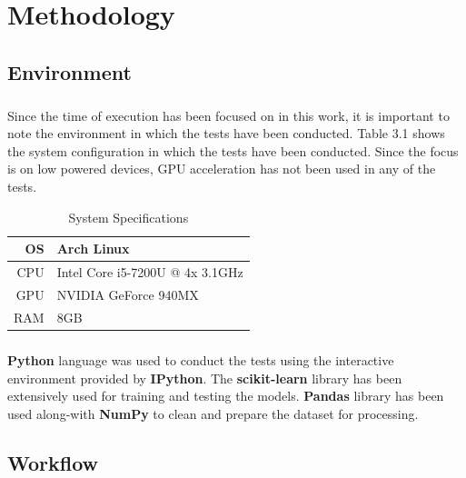 \chapter{Methodology}
\label{ch:PD}

\section{Environment}

\paragraph{}
Since the time of execution has been focused on in this work, it is important to note the environment in which the tests have been conducted. Table 3.1 shows the system configuration in which the tests have been conducted. Since the focus is on low powered devices, GPU acceleration has not been used in any of the tests.
\begin{table}[h]
    \centering
    \caption{System Specifications}
    \begin{tabular}{| r | l |}
        \hline
        OS & Arch Linux \\
        \hline
        CPU & Intel Core i5-7200U @ 4x 3.1GHz \\
        \hline
        GPU & NVIDIA GeForce 940MX \\
        \hline
        RAM & 8GB \\
        \hline
    \end{tabular}
\end{table}

\paragraph{}
\textbf{Python} language was used to conduct the tests using the interactive environment provided by \textbf{IPython}. The \textbf{scikit-learn} library has been extensively used for training and testing the models. \textbf{Pandas} library has been used along-with \textbf{NumPy} to clean and prepare the dataset for processing.

\section{Workflow}

